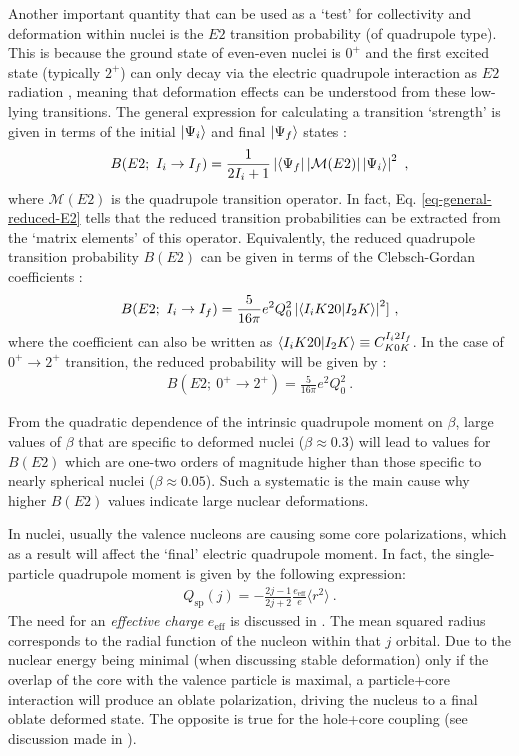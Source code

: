 Another important quantity that can be used as a `test' for collectivity and deformation within nuclei is the $E2$ transition probability (of quadrupole type). This is because the ground state of even-even nuclei is $0^+$ and the first excited state (typically $2^+$) can only decay via the electric quadrupole interaction as $E2$ radiation \cite{casten2000nuclear}, meaning that deformation effects can be understood from these low-lying transitions. The general expression for calculating a transition `strength' is given in terms of the initial $\ket{\Psi_i}$ and final $\ket{\Psi_f}$ states \cite{matta2017exotic}:
\begin{align}
    B(E2;\ I_i\to I_f)=\frac{1}{2I_i+1}\left|\bra{\Psi_f}\left|\mathcal{M}(E2)\right|\ket{\Psi_i}\right|^2\ ,
    \label{eq-general-reduced-E2}
\end{align}
where $\mathcal{M}(E2)$ is the quadrupole transition operator. In fact, Eq. \ref{eq-general-reduced-E2} tells that the reduced transition probabilities can be extracted from the `matrix elements' of this operator. Equivalently, the reduced quadrupole transition probability $B(E2)$ can be given in terms of the Clebsch-Gordan coefficients \cite{bohr1998nuclear}:
\begin{align}
    B(E2;\ I_i\to I_f)=\frac{5}{16\pi}e^2Q_0^2\left|\bra{I_iK20}\ket{I_2K}\right|^2]\ ,
    \label{eq-general-reduced-E2-clebsch-gordan}
\end{align}
where the coefficient can also be written as $\bra{I_iK20}\ket{I_2K}\equiv C^{I_i2I_f}_{K0K}$. In the case of $0^+\to 2^+$ transition, the reduced probability will be given by \cite{ring2004nuclear}:
\begin{align}
    B(E2;\ 0^+\to 2^+)=\frac{5}{16\pi}e^2Q_0^2\ .
\end{align}

From the quadratic dependence of the intrinsic quadrupole moment on $\beta$, large values of $\beta$ that are specific to deformed nuclei ($\beta\approx 0.3$) will lead to values for $B(E2)$ which are one-two orders of magnitude higher than those specific to nearly spherical nuclei ($\beta\approx 0.05$). Such a systematic is the main cause why higher $B(E2)$ values indicate large nuclear deformations.

In nuclei, usually the valence nucleons are causing some core polarizations, which as a result will affect the `final' electric quadrupole moment. In fact, the single-particle quadrupole moment is given by the following expression:
\begin{align}
    Q_\text{sp}(j)=-\frac{2j-1}{2j+2}\frac{e_\text{eff}}{e}\langle r^2\rangle\ .
    \label{single-particle-quadrupole-moment}
\end{align}
The need for an \emph{effective charge} $e_\text{eff}$ is discussed in \cite{heyde1994nuclear}. The mean squared radius corresponds to the radial function of the nucleon within that $j$ orbital. Due to the nuclear energy being minimal (when discussing stable deformation) only if the overlap of the core with the valence particle is maximal, a particle+core interaction will produce an oblate polarization, driving the nucleus to a final oblate deformed state. The opposite is true for the hole+core coupling (see discussion made in \cite{neugart2006nuclear}).

